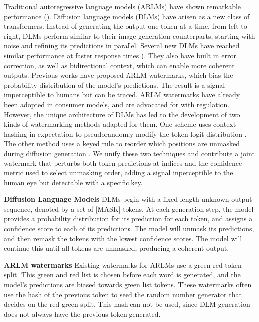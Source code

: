 

Traditional autoregressive language models (ARLMs) have shown remarkable performance (\cite{llama3herd2024}).
Diffusion language models (DLMs) have arisen as a new class of transformers. Instead of generating the output one
token at a time, from left to right, DLMs perform similar to their image generation counterparts, starting with noise
 and refining its predictions in parallel. Several new DLMs have reached similar performance at faster response times
  (\cite{nie2025large, google2025gemini, ye2025dream7b}. They also have built in error correction, as well as
  bidirectional context, which can enable more coherent outputs. Previous works have proposed ARLM watermarks,
  which bias the probability distribution of the model's predictions. The result is a signal imperceptible to humans
   but can be traced. ARLM watermarks have already been adopted in consumer models, and are advocated for with
   regulation. However, the unique architecture of DLMs has led to the development of two kinds of watermarking methods adapted for them.
   One scheme uses context hashing in expectation to pseudorandomly modify the token logit distribution \cite{gloaguen2025dlm}. The other method
   uses a keyed rule to reorder which positions are unmasked during diffusion generation \cite{hong2026dgmark}. We unify these two techniques and
   contribute a joint watermark that perturbs both token predictions at indices and the confidence metric used to select unmasking order, adding a signal
   inperceptible to the human eye but detectable with a specific key.


\textbf{Diffusion Language Models}
DLMs begin with a fixed length unknown output sequence, denoted by a set of [MASK] tokens. At each generation step, the model provides a probability distribution for its prediction for each token, and assigns a confidence score to each of its predictions. The model will unmask its predictions, and then remask the tokens with the lowest confidence scores. The model will continue this until all tokens are unmasked, producing a coherent output.


\textbf{ARLM watermarks}
Existing watermarks for ARLMs use a green-red token split. This green and red list is chosen before each word is generated, and the model's predictions are biased towards green list tokens. These watermarks often use the hash of the previous token to seed the random number generator that decides on the red-green split. This hash can not be used, since DLM generation does not always have the previous token generated.


